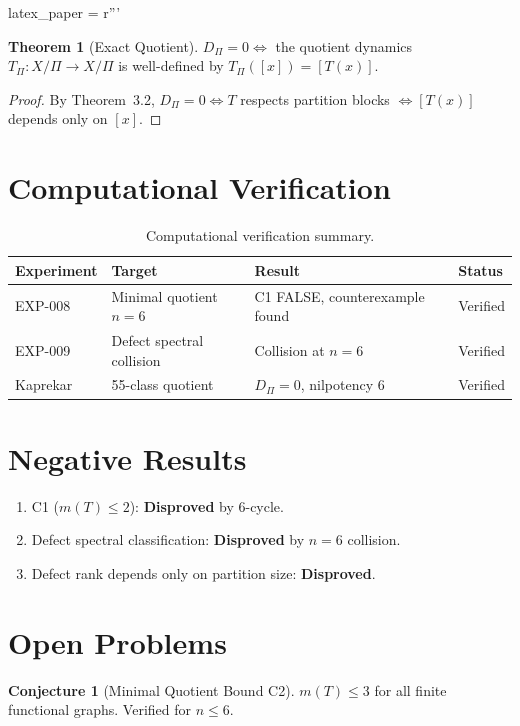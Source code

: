 latex_paper = r'''\documentclass[11pt,a4paper]{article}
\theoremstyle{definition}
\newtheorem{theorem}{Theorem}[section]
\newtheorem{conjecture}{Conjecture}[section]
\begin{document}
\begin{theorem}[Exact Quotient]
$D_\Pi = 0 \iff$ the quotient dynamics $T_\Pi: X/\Pi \to X/\Pi$ is well-defined by $T_\Pi([x]) = [T(x)]$.
\end{theorem}

\begin{proof}
By Theorem~3.2, $D_\Pi = 0 \iff T$ respects partition blocks $\iff [T(x)]$ depends only on $[x]$.
\end{proof}

\section{Computational Verification}

\begin{table}[h]
\centering
\begin{tabular}{llll}
\toprule
Experiment & Target & Result & Status \\
\midrule
EXP-008 & Minimal quotient $n=6$ & C1 FALSE, counterexample found & Verified \\
EXP-009 & Defect spectral collision & Collision at $n=6$ & Verified \\
Kaprekar & 55-class quotient & $D_\Pi = 0$, nilpotency 6 & Verified \\
\bottomrule
\end{tabular}
\caption{Computational verification summary.}
\end{table}

\section{Negative Results}

\begin{enumerate}
    \item C1 ($m(T) \leq 2$): \textbf{Disproved} by 6-cycle.
    \item Defect spectral classification: \textbf{Disproved} by $n=6$ collision.
    \item Defect rank depends only on partition size: \textbf{Disproved}.
\end{enumerate}

\section{Open Problems}

\begin{conjecture}[Minimal Quotient Bound C2]
$m(T) \leq 3$ for all finite functional graphs. Verified for $n \leq 6$.
\end{conjecture}
\end{document}
